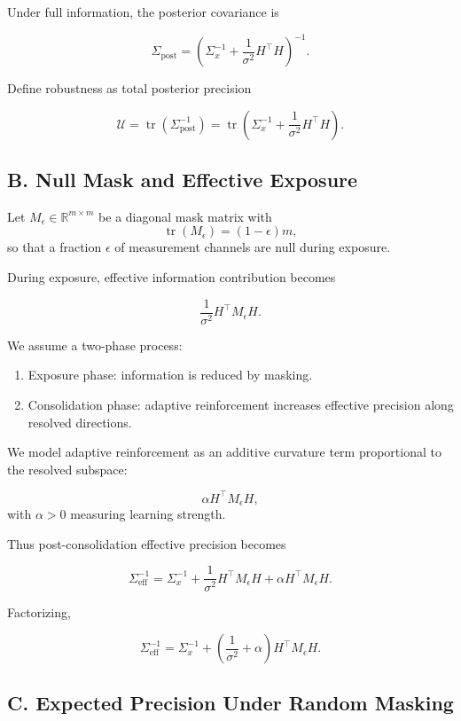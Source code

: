 \documentclass[11pt]{article}
\theoremstyle{remark}
\begin{document}
Under full information, the posterior covariance is

\[
\Sigma_{\text{post}}
=
\left(
\Sigma_x^{-1}
+
\frac{1}{\sigma^2} H^\top H
\right)^{-1}.
\]

Define robustness as total posterior precision

\[
\mathcal{U}
=
\operatorname{tr}(\Sigma_{\text{post}}^{-1})
=
\operatorname{tr}\!\left(
\Sigma_x^{-1}
+
\frac{1}{\sigma^2} H^\top H
\right).
\]

\subsection*{B. Null Mask and Effective Exposure}

Let $M_\epsilon \in \mathbb{R}^{m \times m}$ be a diagonal mask matrix with
\[
\operatorname{tr}(M_\epsilon) = (1-\epsilon)m,
\]
so that a fraction $\epsilon$ of measurement channels are null during exposure.

During exposure, effective information contribution becomes

\[
\frac{1}{\sigma^2} H^\top M_\epsilon H.
\]

We assume a two-phase process:

\begin{enumerate}
\item Exposure phase: information is reduced by masking.
\item Consolidation phase: adaptive reinforcement increases effective precision along resolved directions.
\end{enumerate}

We model adaptive reinforcement as an additive curvature term proportional to the resolved subspace:

\[
\alpha H^\top M_\epsilon H,
\]
with $\alpha > 0$ measuring learning strength.

Thus post-consolidation effective precision becomes

\[
\Sigma_{\text{eff}}^{-1}
=
\Sigma_x^{-1}
+
\frac{1}{\sigma^2} H^\top M_\epsilon H
+
\alpha H^\top M_\epsilon H.
\]

Factorizing,

\[
\Sigma_{\text{eff}}^{-1}
=
\Sigma_x^{-1}
+
\left(
\frac{1}{\sigma^2} + \alpha
\right)
H^\top M_\epsilon H.
\]

\subsection*{C. Expected Precision Under Random Masking}
\end{document}
